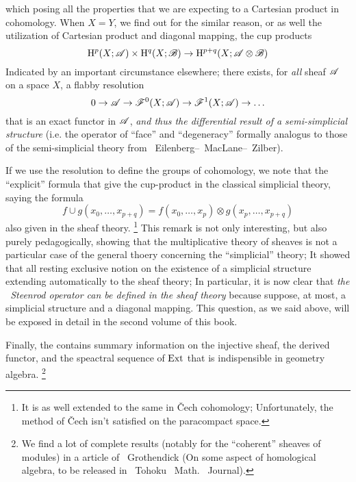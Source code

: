 \oldpage[V]
which posing all the properties that we are expecting to a Cartesian product in cohomology. 
When $X = Y$, we find out for the similar reason, or as well the utilization of Cartesian product and diagonal mapping, 
the cup products 
\[
    \mathrm{H}^p(X;\mathscr{A})\times \mathrm{H}^q(X;\mathscr{B})\rightarrow \mathrm{H}^{p+q}(X; \mathscr{A}\otimes \mathscr{B})
\]
Indicated by an important circumstance elsewhere; there exists, for \emph{all} sheaf $\mathscr{A}$ on a space $X$, a flabby resolution 
\[
    0\rightarrow \mathscr{A} \rightarrow \mathscr{F}^0(X;\mathscr{A}) \rightarrow \mathscr{F}^1(X;\mathscr{A}) \rightarrow \ldots
\]
that is an exact functor in $\mathscr{A}$, \emph{and thus the differential result of a semi-simplicial structure} 
(i.e. the operator of ``face'' and ``degeneracy'' formally analogus to those of the semi-simplicial theory from ~Eilenberg--~MacLane--~Zilber).

If we use the resolution to define the groups of cohomology, 
we note that the ``explicit'' formula that give the cup-product in the classical simplicial theory, saying the formula 
\[
    f\cup g(x_0,\ldots,x_{p+q}) = f(x_0,\ldots,x_p)\otimes g(x_p,\ldots,x_{p+q})
\]
also given in the sheaf theory.
\footnote[1]{It is as well extended to the same in \v{C}ech cohomology; Unfortunately, the method of \v{C}ech isn't satisfied on the paracompact space.}
This remark is not only interesting, but also purely pedagogically, 
showing that the multiplicative theory of sheaves is not a particular case of the general thoery concerning the ``simplicial'' theory;
It showed that all resting exclusive notion on the existence of a simplicial structure extending automatically to the sheaf theory; 
In particular, it is now clear that \emph{the ~Steenrod operator can be defined in the sheaf theory} because suppose, at most, 
a simplicial structure and a diagonal mapping. 
This question, as we said above, will be exposed in detail in the second volume of this book.

Finally, the  contains summary information on the injective sheaf, the derived functor, 
and the speactral sequence of $\operatorname{Ext}$ that is indispensible in geometry algebra.
\footnote[2]{We find a lot of complete results (notably for the ``coherent'' sheaves of modules) in a article of ~Grothendick 
(On some aspect of homological algebra, to be released in ~Tohoku ~Math. ~Journal).}



